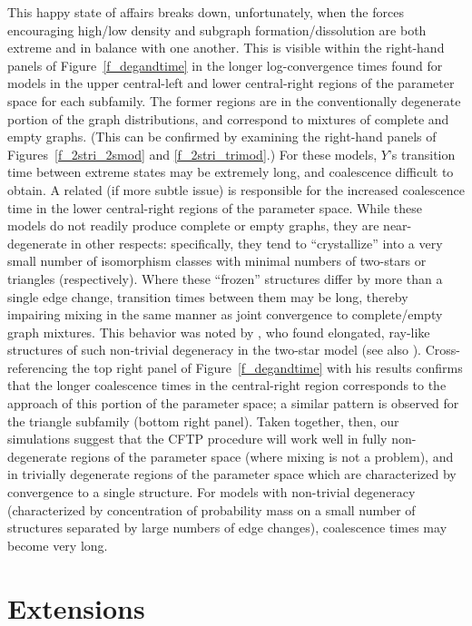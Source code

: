\documentclass[11pt]{article}
\begin{document}
This happy state of affairs breaks down, unfortunately, when the forces encouraging high/low density and subgraph formation/dissolution are both extreme and in balance with one another.  This is visible within the right-hand panels of Figure~\ref{f_degandtime} in the longer log-convergence times found for models in the upper central-left and lower central-right regions of the parameter space for each subfamily.  The former regions are in the conventionally degenerate portion of the graph distributions, and correspond to mixtures of complete and empty graphs.  (This can be confirmed by examining the right-hand panels of Figures~\ref{f_2stri_2smod} and \ref{f_2stri_trimod}.)  For these models, $Y$'s transition time between extreme states may be extremely long, and coalescence difficult to obtain.  A related (if more subtle issue) is responsible for the increased coalescence time in the lower central-right regions of the parameter space.  While these models do not readily produce complete or empty graphs, they are near-degenerate in other respects: specifically, they tend to ``crystallize'' into a very small number of isomorphism classes with minimal numbers of two-stars or triangles (respectively).  Where these ``frozen'' structures differ by more than a single edge change, transition times between them may be long, thereby impairing mixing in the same manner as joint convergence to complete/empty graph mixtures.  This behavior was noted by \citet{handcock:ch:2003}, who found elongated, ray-like structures of such non-trivial degeneracy in the two-star model (see also \citet{robins.et.al:ajs:2005}).  Cross-referencing the top right panel of Figure~\ref{f_degandtime} with his results confirms that the longer coalescence times in the central-right region corresponds to the approach of this portion of the parameter space; a similar pattern is observed for the triangle subfamily (bottom right panel).  Taken together, then, our simulations suggest that the CFTP procedure will work well in fully non-degenerate regions of the parameter space (where mixing is not a problem), and in trivially degenerate regions of the parameter space which are characterized by convergence to a single structure.  For models with non-trivial degeneracy (characterized by concentration of probability mass on a small number of structures separated by large numbers of edge changes), coalescence times may become very long.

\section{Extensions \label{sec_ext}}
\end{document}
